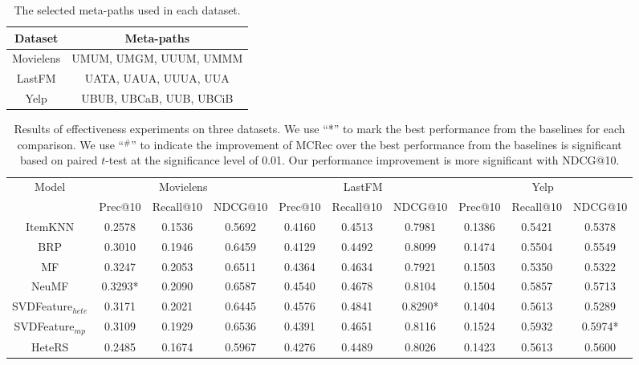 \begin{table}[t]%
\center
\normalsize
\caption{\label{tab_metapath} The selected meta-paths used in each dataset.}
{\begin{tabular}{|c||c|}
\hline
{Dataset} & {Meta-paths}\\
\hline
{Movielens} & {UMUM, UMGM, UUUM, UMMM}\\
\hline
{LastFM} & {UATA, UAUA, UUUA, UUA} \\
\hline
{Yelp} & {UBUB, UBCaB, UUB, UBCiB} \\
\hline
\end{tabular}}
\end{table}


\begin{table}[t]
\centering
\caption{\label{tab_Effectiveness} Results of effectiveness experiments on three datasets. We use ``*'' to mark the best performance from the baselines for each comparison. We use ``$^{\#}$'' to indicate the improvement of MCRec over the best performance from the baselines is significant based on paired $t$-test at the significance level of 0.01.
Our performance improvement is more significant with NDCG@10.}
{
\begin{tabular}{|c||c|c|c||c|c|c||c|c|c|}
\hline
\multirow{2}{*}{Model}&
\multicolumn{3}{c||}{Movielens}& \multicolumn{3}{c||}{LastFM} & \multicolumn{3}{c|}{Yelp}\\
\cline{2-10}
  & {Prec@10}&{Recall@10} & {NDCG@10} & {Prec@10}&{Recall@10} & {NDCG@10} & {Prec@10}&{Recall@10} & {NDCG@10}\\
\hline
\hline
{ItemKNN} & {0.2578} & {0.1536} & {0.5692} & {0.4160} & {0.4513} & {0.7981} & {0.1386} & {0.5421} & {0.5378}\\
\hline
{BRP} & {0.3010} & {0.1946} & {0.6459} & {0.4129} & {0.4492} & {0.8099} & {0.1474} & {0.5504} & {0.5549}\\
\hline
{MF} & {0.3247} & {0.2053} & {0.6511} & {0.4364} & {0.4634} & {0.7921} & {0.1503} & {0.5350} & {0.5322}\\
\hline
{NeuMF} & {0.3293*} & {0.2090} & {0.6587} & {0.4540} & {0.4678} & {0.8104} & {0.1504} & {0.5857} & {0.5713}\\
\hline
{SVDFeature$_{hete}$} & {0.3171} & {0.2021} & {0.6445} & {0.4576} & {0.4841} & {0.8290*} & {0.1404} & {0.5613} & {0.5289}\\
\hline
{SVDFeature$_{mp}$} & {0.3109} & {0.1929} & {0.6536} & {0.4391} & {0.4651} & {0.8116} & {0.1524} & {0.5932} & {0.5974*}\\
\hline
{HeteRS} & {0.2485} & {0.1674} & {0.5967} & {0.4276} & {0.4489} & {0.8026} & {0.1423} & {0.5613} & {0.5600}\\

\end{tabular}}
\end{table}
